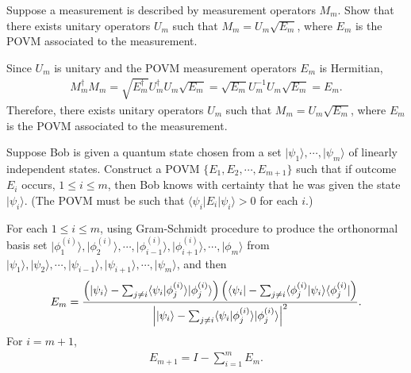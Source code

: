 \documentclass[en]{sol-man}
\begin{document}
\begin{exe}
    Suppose a measurement is described by measurement operators $M_m$. Show that there exists unitary operators $U_m$ such that $M_m=U_m\sqrt{E_m}$, where $E_m$ is the POVM associated to the measurement.
\end{exe}
\begin{pf}
    Since $U_m$ is unitary and the POVM measurement operators $E_m$ is Hermitian,
    \begin{align}
        M_m^{\dagger}M_m=\sqrt{E_m^{\dagger}}U_m^{\dagger}U_m\sqrt{E_m}=\sqrt{E_m}U_m^{-1}U_m\sqrt{E_m}=E_m.
    \end{align}
    Therefore, there exists unitary operators $U_m$ such that $M_m=U_m\sqrt{E_m}$, where $E_m$ is the POVM associated to the measurement.
\end{pf}

\begin{exe}
    Suppose Bob is given a quantum state chosen from a set $\lvert\psi_1\rangle,\cdots,\lvert\psi_m\rangle$ of linearly independent states. Construct a POVM $\{E_1,E_2,\cdots,E_{m+1}\}$ such that if outcome $E_i$ occurs, $1\leq i\leq m$, then Bob knows with certainty that he was given the state $\lvert\psi_i\rangle$. (The POVM must be such that $\langle\psi_i\rvert E_i\lvert\psi_i\rangle>0$ for each $i$.)
\end{exe}
\begin{sol}
    For each $1\leq i\leq m$, using Gram-Schmidt procedure to produce the orthonormal basis set $\lvert\phi_1^{(i)}\rangle,\lvert\phi_2^{(i)}\rangle,\cdots,\lvert\phi_{i-1}^{(i)}\rangle,\lvert\phi_{i+1}^{(i)}\rangle,\cdots,\lvert\phi_m\rangle$ from $\lvert\psi_1\rangle,\lvert\psi_2\rangle,\cdots,\lvert\psi_{i-1}\rangle,\lvert\psi_{i+1}\rangle,\cdots,\lvert\psi_m\rangle$, and then
    \begin{align}
        E_m=\frac{\left(\lvert\psi_i\rangle-\sum_{j\neq i}\langle\psi_i\vert\phi_j^{(i)}\rangle\lvert\phi_j^{(i)}\rangle\right)\left(\langle\psi_i\rvert-\sum_{j\neq i}\langle\phi_j^{(i)}\vert\psi_i\rangle\langle\phi_j^{(i)}\rvert\right)}{\left\lvert\lvert\psi_i\rangle-\sum_{j\neq i}\langle\psi_i\vert\phi_j^{(i)}\rangle\lvert\phi_j^{(i)}\rangle\right\rvert^2}.
    \end{align}
    For $i=m+1$,
    \begin{align}
        E_{m+1}=I-\sum_{i=1}^mE_m.
    \end{align}
\end{sol}
\end{document}
